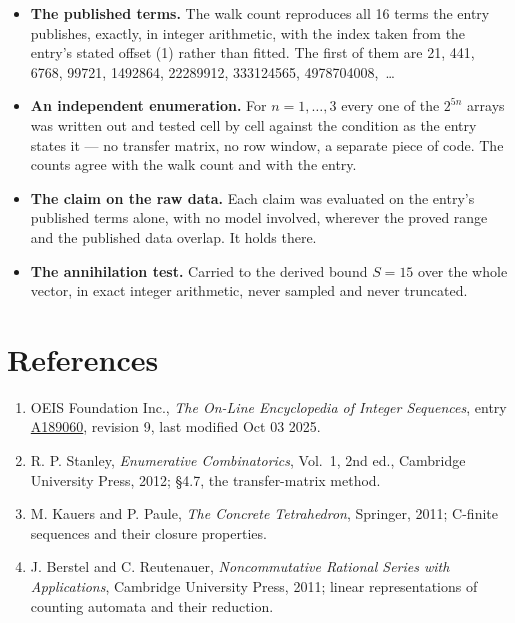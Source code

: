 \documentclass[11pt]{article}
\theoremstyle{definition}
\begin{document}
\begin{itemize}

\item {\bfseries The published terms.} The walk count reproduces all 16 terms the entry publishes, exactly, in integer arithmetic, with the index taken from the entry's stated offset (1) rather than fitted. The first of them are 21, 441, 6768, 99721, 1492864, 22289912, 333124565, 4978704008,~\dots

\item {\bfseries An independent enumeration.} For $n = 1,\dots,3$ every one of the $2^{5n}$ arrays was written out and tested cell by cell against the condition as the entry states it --- no transfer matrix, no row window, a separate piece of code. The counts agree with the walk count and with the entry.

\item {\bfseries The claim on the raw data.} Each claim was evaluated on the entry's published terms alone, with no model involved, wherever the proved range and the published data overlap. It holds there.

\item {\bfseries The annihilation test.} Carried to the derived bound $S = 15$ over the whole vector, in exact integer arithmetic, never sampled and never truncated.

\end{itemize}

\section{References}

\begin{enumerate}

\item OEIS Foundation Inc., \emph{The On-Line Encyclopedia of Integer Sequences}, entry \href{https://oeis.org/A189060}{A189060}, revision 9, last modified Oct 03 2025.

\item R. P. Stanley, \emph{Enumerative Combinatorics}, Vol.~1, 2nd ed., Cambridge University Press, 2012; \S4.7, the transfer-matrix method.

\item M. Kauers and P. Paule, \emph{The Concrete Tetrahedron}, Springer, 2011; C-finite sequences and their closure properties.

\item J. Berstel and C. Reutenauer, \emph{Noncommutative Rational Series with Applications}, Cambridge University Press, 2011; linear representations of counting automata and their reduction.

\end{enumerate}
\end{document}
